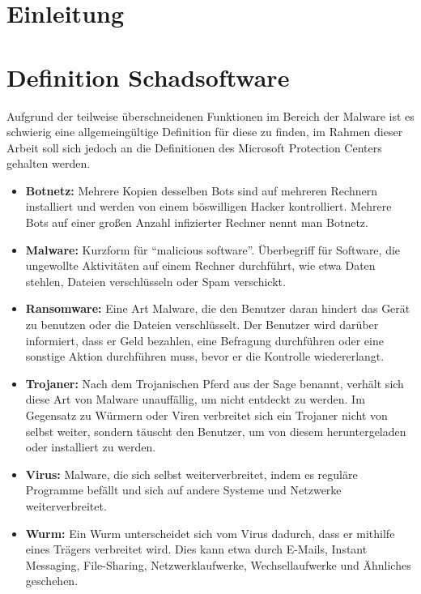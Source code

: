 \section{Einleitung}
\label{sec:einleitung}

\section{Definition Schadsoftware}
\label{sec:definition}
		Aufgrund der teilweise überschneidenen Funktionen im Bereich der Malware ist es schwierig eine allgemeingültige Definition für diese zu finden, im Rahmen dieser Arbeit soll sich jedoch an die Definitionen des Microsoft Protection Centers \cite{malware_pc} gehalten werden.

		\begin{itemize}
			\item \textbf{Botnetz:} Mehrere Kopien des­sel­ben Bots sind auf mehreren Rechnern installiert und werden von einem böswilligen Hacker kontrolliert. Mehrere Bots auf einer großen Anzahl infizierter Rechner nennt man Botnetz.
			\item \textbf{Malware:}	Kurzform für ``malicious software''. Überbegriff für Software, die ungewollte Aktivitäten auf einem Rechner durchführt, wie etwa Daten stehlen, Dateien verschlüsseln oder Spam verschickt.
			\item \textbf{Ransomware:} Eine Art Malware, die den Benutzer daran hindert das Gerät zu benutzen oder die Dateien verschlüsselt. Der Benutzer wird darüber informiert, dass er Geld bezahlen, eine Befragung durchführen oder eine sonstige Aktion durchführen muss, bevor er die Kontrolle wiedererlangt.
			\item \textbf{Trojaner:} Nach dem Trojanischen Pferd aus der Sage benannt, verhält sich diese Art von Malware unauffällig, um nicht entdeckt zu werden. Im Gegensatz zu Würmern oder Viren verbreitet sich ein Trojaner nicht von selbst weiter, sondern täuscht den Benutzer, um von diesem heruntergeladen oder installiert zu werden.
			\item \textbf{Virus:} Malware, die sich selbst weiterverbreitet, indem es reguläre Programme befällt und sich auf andere Systeme und Netzwerke weiterverbreitet.
			\item \textbf{Wurm:} Ein Wurm unterscheidet sich vom Virus dadurch, dass er mithilfe eines Trägers verbreitet wird. Dies kann etwa durch E-Mails, Instant Messaging, File-Sharing, Netzwerklaufwerke, Wechsellaufwerke und Ähnliches geschehen.
		\end{itemize}

